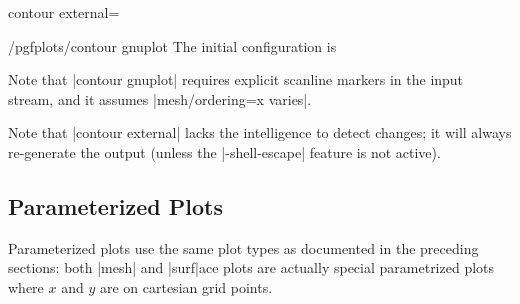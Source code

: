 {{\begin{plottype}[/pgfplots]{contour external=\textcolor{black}{}}
	\begin{stylekey}{/pgfplots/contour gnuplot}
		\label{key:pgfplots:contour:gnuplot}
		The initial configuration is
\begin{codeexample}
\end{codeexample}
	Note that |contour gnuplot| requires explicit scanline markers in the input stream, and it assumes |mesh/ordering=x varies|.
	\end{stylekey}

	Note that |contour external| lacks the intelligence to detect changes; it will always re-generate the output (unless the |-shell-escape| feature is not active).
\end{plottype}

% 
% 

}

\subsection{Parameterized Plots}
{%
%
Parameterized plots use the same plot types as documented in the preceding sections: both |mesh| and |surf|ace plots are actually special parametrized plots where $x$ and $y$ are on cartesian grid points.

}}

